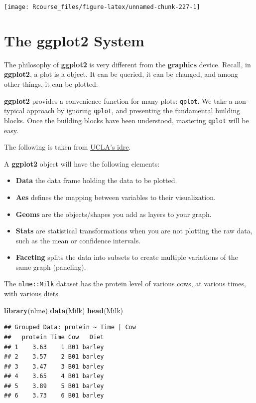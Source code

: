 \documentclass[]{book}
\newenvironment{Shaded}{\begin{snugshade}}{\end{snugshade}}
\newcommand{\KeywordTok}[1]{\textcolor[rgb]{0.13,0.29,0.53}{\textbf{#1}}}
\newcommand{\NormalTok}[1]{#1}
\providecommand{\tightlist}{%
  \setlength{\itemsep}{0pt}\setlength{\parskip}{0pt}}
\theoremstyle{definition}
\theoremstyle{definition}
\theoremstyle{definition}
\theoremstyle{remark}
\begin{document}
\texttt{[image: Rcourse\_files/figure-latex/unnamed-chunk-227-1]}

\section{The ggplot2 System}\label{the-ggplot2-system}

The philosophy of \textbf{ggplot2} is very different from the
\textbf{graphics} device. Recall, in \textbf{ggplot2}, a plot is a
object. It can be queried, it can be changed, and among other things, it
can be plotted.

\textbf{ggplot2} provides a convenience function for many plots:
\texttt{qplot}. We take a non-typical approach by ignoring
\texttt{qplot}, and presenting the fundamental building blocks. Once the
building blocks have been understood, mastering \texttt{qplot} will be
easy.

The following is taken from
\href{http://www.ats.ucla.edu/stat/r/seminars/ggplot2_intro/ggplot2_intro.htm}{UCLA's
idre}.

A \textbf{ggplot2} object will have the following elements:

\begin{itemize}
\tightlist
\item
  \textbf{Data} the data frame holding the data to be plotted.
\item
  \textbf{Aes} defines the mapping between variables to their
  visualization.
\item
  \textbf{Geoms} are the objects/shapes you add as layers to your graph.
\item
  \textbf{Stats} are statistical transformations when you are not
  plotting the raw data, such as the mean or confidence intervals.
\item
  \textbf{Faceting} splits the data into subsets to create multiple
  variations of the same graph (paneling).
\end{itemize}

The \texttt{nlme::Milk} dataset has the protein level of various cows,
at various times, with various diets.

\begin{Shaded}
\begin{Highlighting}[]
\KeywordTok{library}\NormalTok{(nlme)}
\KeywordTok{data}\NormalTok{(Milk)}
\KeywordTok{head}\NormalTok{(Milk)}
\end{Highlighting}
\end{Shaded}

\begin{verbatim}
## Grouped Data: protein ~ Time | Cow
##   protein Time Cow   Diet
## 1    3.63    1 B01 barley
## 2    3.57    2 B01 barley
## 3    3.47    3 B01 barley
## 4    3.65    4 B01 barley
## 5    3.89    5 B01 barley
## 6    3.73    6 B01 barley
\end{verbatim}
\end{document}
